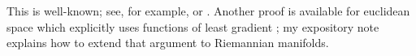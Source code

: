 \documentclass[reqno,11pt]{amsart}
\newcommand{\RR}{\mathbf{R}}
\newcommand{\Ball}{\mathbf{B}}
\newcommand*\dif{\mathop{}\!\mathrm{d}}
\DeclareMathOperator{\Div}{div}
\newcommand{\cpt}{\mathrm{cpt}}
\newtheorem{theorem}{Theorem}[section]
\theoremstyle{definition}
\numberwithin{equation}{section}
\begin{document}
This is well-known; see, for example, \cite{DeLellis18} or \cite[Chapter 8]{morgan2016geometric}.
Another proof is available for euclidean space which explicitly uses functions of least gradient \cite[Theorem 10.11]{Giusti77}; my expository note \cite{BackusFLG} explains how to extend that argument to Riemannian manifolds.





\end{document}
